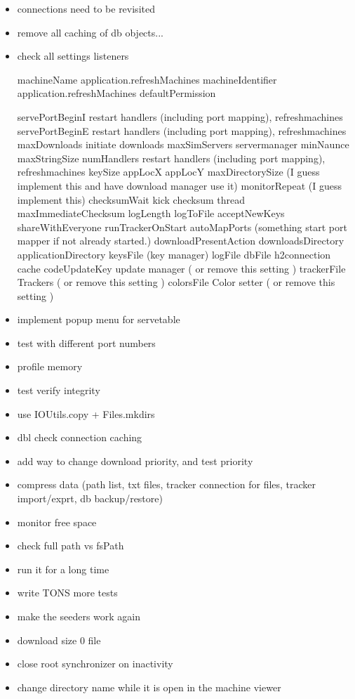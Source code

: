 \documentclass{article}
\begin{document}
\begin{itemize}
\item connections need to be revisited
\item remove all caching of db objects...
\item check all settings listeners

machineName          application.refreshMachines
machineIdentifier    application.refreshMachines
defaultPermission    
                     
                     
servePortBeginI      restart handlers (including port mapping), refreshmachines
servePortBeginE      restart handlers (including port mapping), refreshmachines
maxDownloads         initiate downloads
maxSimServers        servermanager
minNaunce            
maxStringSize        
numHandlers          restart handlers (including port mapping), refreshmachines
keySize              
appLocX              
appLocY              
maxDirectorySize     (I guess implement this and have download manager use it)
monitorRepeat        (I guess implement this)
checksumWait         kick checksum thread
maxImmediateChecksum 
logLength            
logToFile            
acceptNewKeys        
shareWithEveryone    
runTrackerOnStart    
autoMapPorts         (something start port mapper if not already started.)
downloadPresentAction
downloadsDirectory   
applicationDirectory 
keysFile             (key manager)
logFile              
dbFile               h2connection cache
codeUpdateKey        update manager ( or remove this setting )
trackerFile          Trackers ( or remove this setting )
colorsFile           Color setter ( or remove this setting )


\item implement popup menu for servetable
\item test with different port numbers
\item profile memory
\item test verify integrity
\item use IOUtils.copy + Files.mkdirs
\item dbl check connection caching
\item add way to change download priority, and test priority
\item compress data (path list, txt files, tracker connection for files, tracker import/exprt, db backup/restore)
\item monitor free space
\item check full path vs fsPath
\item run it for a long time
\item write TONS more tests
\item make the seeders work again
\item download size 0 file

\item close root synchronizer on inactivity
\item change directory name while it is open in the machine viewer
\end{itemize}
\end{document}
